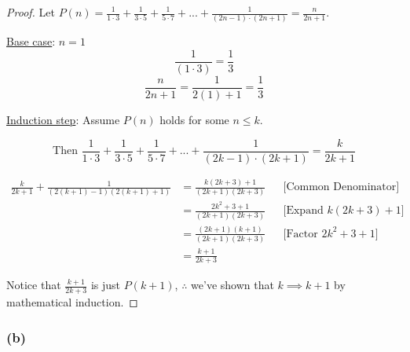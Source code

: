 \documentclass[10pt]{article}
\begin{document}
\begin{proof}
  Let $P(n) = \frac{1}{1 \cdot 3} + \frac{1}{3 \cdot 5} + \frac{1}{5 \cdot 7} +
  ... + \frac{1}{(2n - 1) \cdot (2n + 1)} = \frac{n}{2n + 1}$.
  \spacing

  \noindent
  \underline{Base case}: $n = 1$
  $$ \frac{1}{(1 \cdot 3)} = \frac{1}{3} $$
  $$ \frac{n}{2n + 1} = \frac{1}{2(1) + 1} = \frac{1}{3} $$
  \spacing

  \noindent
  \underline{Induction step}:
  Assume $P(n)$ holds for some $n \le k$.

  $$ \text{Then } \frac{1}{1 \cdot 3} + \frac{1}{3 \cdot 5} +
  \frac{1}{5 \cdot 7} + ... + \frac{1}{(2k - 1) \cdot (2k + 1)} = \frac{k}{2k + 1} $$

  \begin{align*}
    \frac{k}{2k + 1} + \frac{1}{(2(k + 1) - 1)(2(k + 1) + 1)} &=
    \frac{k(2k + 3) + 1}{(2k + 1)(2k + 3)} && \text{[Common Denominator]} \\
      &= \frac{2k^2 + 3 + 1}{(2k + 1)(2k + 3)} && \text{[Expand $k(2k + 3) + 1$]} \\
      &= \frac{(2k + 1)(k + 1)}{(2k + 1)(2k + 3)} && \text{[Factor $2k^2 + 3 + 1$]} \\
      &= \frac{k + 1}{2k + 3}
  \end{align*}

  \noindent
  Notice that $\frac{k + 1}{2k + 3}$ is just $P(k + 1)$, $\therefore$ we've shown that $k \implies k + 1$
  by mathematical induction.
\end{proof}

\subsubsection*{(b)}
\end{document}
